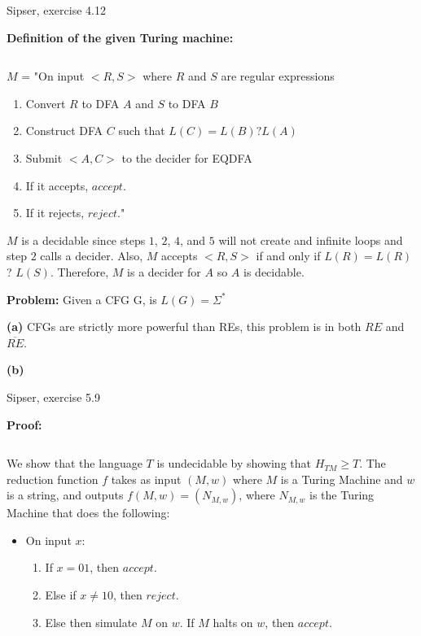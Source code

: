 \documentclass[11pt]{article}
\newcommand{\question}[2] {\vspace{.25in} \fbox{#1} #2 \vspace{.10in}}
\renewcommand{\part}[1] {\vspace{.10in} {\bf (#1)}}
\begin{document}
\question{4}{Sipser, exercise 4.12}

\textbf{Definition of the given Turing machine:}

$ $

$M$ = "On input $<R,S>$ where $R$ and $S$ are regular expressions 

 \begin{center}
   \begin{enumerate}
     \item Convert $R$ to DFA $A$ and $S$ to DFA $B$ 
     \item Construct DFA $C$ such that $L(C) = L(B) ? L(A)$ 
     \item Submit $<A,C>$ to the decider for EQDFA 
     \item If it accepts, $accept$.
     \item If it rejects, $reject$." 
   \end{enumerate}
 \end{center}
     
$M$ is a decidable since steps $1$, $2$, $4$, and $5$ will not create and infinite loops and step
\indent $2$ calls a decider.  Also, $M$ accepts $<R,S>$ if and only if $L(R) = L(R)$ ? $L(S).$ 
\indent Therefore, $M$ is a decider for $A$ so $A$ is decidable. 

\question{5}{\textbf{Problem:} Given a CFG G, is $L(G) = \Sigma^{*}$}

\part{a} CFGs are strictly more powerful than REs, this problem is in both $RE$ and $\overline{RE}$.

\part{b}

\question{6}{Sipser, exercise 5.9}

\textbf{Proof:}

$ $

We show that the language $T$ is undecidable by showing that $H_{TM} \geq T$. The reduction 
\indent function $f$ takes as input $(M,w)$ where $M$ is a Turing Machine and $w$ is a string, and 
\indent outputs $f(M,w) = (N_{M,w})$, where $N_{M,w}$ is the Turing Machine that does the following:

 \begin{center}
  \begin{itemize}
    \item On input $x$:
    \begin{enumerate}
     \item If $x = 01$, then $accept$.
     \item Else if $x \not = 10$, then $reject$.
     \item Else then simulate $M$ on $w$. If $M$ halts on $w$, then $accept$.
    \end{enumerate}
  \end{itemize}
 \end{center}
\end{document}
